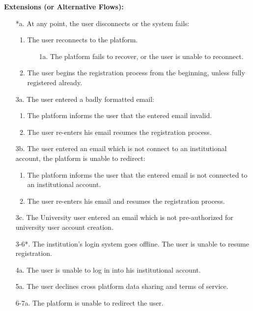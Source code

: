 \begin{itemize}[label={[\textbf{UC}]}, align=left, leftmargin=*]
    \textbf{Extensions (or Alternative Flows):} 
    \begin{enumerate}[label=\arabic*.]
        \item[*a.] At any point, the user disconnects or the system fails:
            \begin{enumerate}[label=\arabic*.]
                \item The user reconnects to the platform.
                    \begin{enumerate}[label=\alph*.]
                        \item[1a.] The platform fails to recover, or the user is unable to reconnect.
                    \end{enumerate}
                 \item The user begins the registration process from the beginning, unless fully registered already.
            \end{enumerate}
        \item[3a.] The user entered a badly formatted email:
            \begin{enumerate}[label=\arabic*.]
                \item The platform informs the user that the entered email invalid.
                \item The user re-enters his email resumes the registration process.
            \end{enumerate}
        \item[3b.] The user entered an email which is not connect to an institutional account, the platform is unable to redirect:
            \begin{enumerate}[label=\arabic*.]
                \item The platform informs the user that the entered email is not connected to an institutional account.
                \item The user re-enters his email and resumes the registration process.
            \end{enumerate}
        \item[3c.] The University user entered an email which is not pre-authorized for university user account creation.
        \item[3-6*.] The institution's login system goes offline. The user is unable to resume registration.
        \item[4a.] The user is unable to log in into his institutional account.
        \item[5a.] The user declines cross platform data sharing and terms of service.
        \item[6-7a.] The platform is unable to redirect the user.
    \end{enumerate}


\end{itemize}
